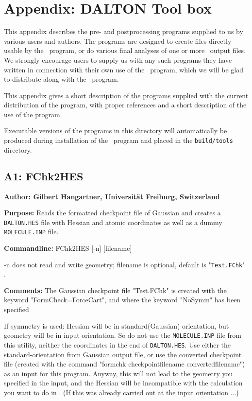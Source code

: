\section*{Appendix: DALTON Tool box}

This appendix describes the pre- and postprocessing programs
supplied to us by various users and authors. The programs are designed
to create files directly usable by the \dalton\ program, or do
various final analyses of one or more \dalton\ output files. We
strongly encourage users to supply us with any such programs they have
written in connection with their own use of the \dalton\ program,
which we will be glad to distribute along with the \dalton\
program.

This appendix gives a short description of the programs supplied with
the current distribution of the program, with proper references and a
short description of the use of the program.

Executable versions of the programs in this directory will
automatically be produced during installation of the \dalton\ program
and placed in the
\verb|build/tools| directory.

\subsection*{A1: FChk2HES}

\noindent
{\large\bf Author: \normalsize\large Gilbert Hangartner,
Universit\"{a}t Freiburg, Switzerland}

\smallskip

\noindent
{\bf Purpose:} Reads the formatted checkpoint file of Gaussian
     and creates a \verb|DALTON.HES| file with Hessian and atomic coordinates
     as well as a dummy \verb|MOLECULE.INP| file.

\smallskip
\noindent
{\bf Commandline:} FChk2HES [-n] [filename]

-n does not read and write geometry; filename is optional, default is
"\verb|Test.FChk|" .

\smallskip
\noindent
{\bf Comments:}     The Gaussian checkpoint file "Test.FChk" is created
     with the keyword "FormCheck=ForceCart", and where the keyword "NoSymm"
     has  been specified

If symmetry is used: Hessian will be in standard(Gaussian) orientation,
        but geometry will be in input orientation. So do not use the
        \verb|MOLECULE.INP| file from this utility,
        neither the coordinates in the end of \verb|DALTON.HES|.
        Use either the standard-orientation from Gaussian output file, or
        use the converted checkpoint file (created with the command
        "formchk checkpointfilename convertedfilename") as an input for
        this program. Anyway, this will not lead to the geometry you
        specified in the input, and the Hessian will be incompatible with the
        calculation you want to do in \dalton. (If this was already carried
        out at the input orientation ...)

